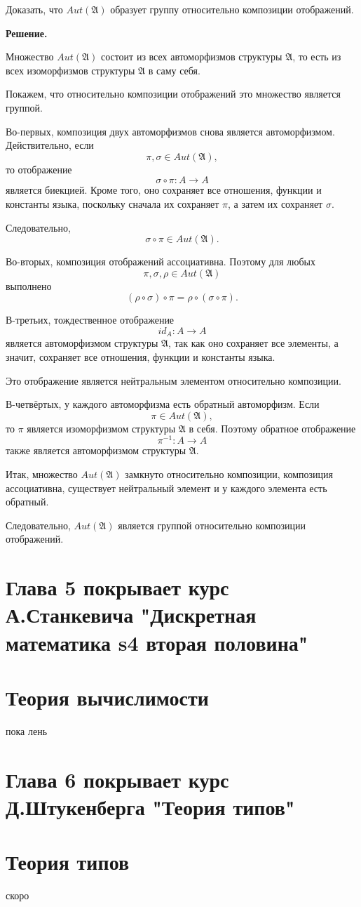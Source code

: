 \documentclass[12pt,a4paper,oneside,openany]{book}
\theoremstyle{definition}
\theoremstyle{plain}
\theoremstyle{remark}
\begin{document}
Доказать, что $Aut(\mathfrak A)$ образует группу относительно композиции отображений.

\par\medskip
\textbf{Решение.}
\par\smallskip

Множество $Aut(\mathfrak A)$ состоит из всех автоморфизмов структуры $\mathfrak A$, то есть из всех изоморфизмов структуры $\mathfrak A$ в саму себя.

Покажем, что относительно композиции отображений это множество является группой.

Во-первых, композиция двух автоморфизмов снова является автоморфизмом. Действительно, если
\[
\pi,\sigma\in Aut(\mathfrak A),
\]
то отображение
\[
\sigma\circ\pi:A\to A
\]
является биекцией. Кроме того, оно сохраняет все отношения, функции и константы языка, поскольку сначала их сохраняет $\pi$, а затем их сохраняет $\sigma$.

Следовательно,
\[
\sigma\circ\pi\in Aut(\mathfrak A).
\]

Во-вторых, композиция отображений ассоциативна. Поэтому для любых
\[
\pi,\sigma,\rho\in Aut(\mathfrak A)
\]
выполнено
\[
(\rho\circ\sigma)\circ\pi=\rho\circ(\sigma\circ\pi).
\]

В-третьих, тождественное отображение
\[
id_A:A\to A
\]
является автоморфизмом структуры $\mathfrak A$, так как оно сохраняет все элементы, а значит, сохраняет все отношения, функции и константы языка.

Это отображение является нейтральным элементом относительно композиции.

В-четвёртых, у каждого автоморфизма есть обратный автоморфизм. Если
\[
\pi\in Aut(\mathfrak A),
\]
то $\pi$ является изоморфизмом структуры $\mathfrak A$ в себя. Поэтому обратное отображение
\[
\pi^{-1}:A\to A
\]
также является автоморфизмом структуры $\mathfrak A$.

Итак, множество $Aut(\mathfrak A)$ замкнуто относительно композиции, композиция ассоциативна, существует нейтральный элемент и у каждого элемента есть обратный.

Следовательно, $Aut(\mathfrak A)$ является группой относительно композиции отображений.


\chapter*{Глава 5 покрывает курс А.Станкевича "Дискретная математика s4 вторая половина"}


\chapter{Теория вычислимости}

пока лень



\chapter*{Глава 6 покрывает курс Д.Штукенберга "Теория типов"}

\chapter{Теория типов}
скоро
\end{document}
